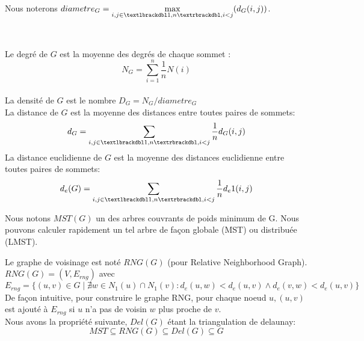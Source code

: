 \begin{mydef}
Nous noterons $diametre_G= \max\limits_{i,j\in \textlbrackdbl 1,n \textrbrackdbl,i<j} (d_G(i,j))$.
\end{mydef}
 


\





\begin{mydef}
 
 Le degré de $G$ est la moyenne des degrés de chaque sommet : $$N_G=\sum_{i=1}^n{\frac1n N(i)}$$\\
 La densité de $G$ est le nombre $D_G=N_G/diametre_G$\\
 La distance de $G$ est la moyenne des distances entre toutes paires de sommets:$$d_G=\sum_{i,j\in \textlbrackdbl 1,n \textrbrackdbl,i<j}{\frac1n d_G(i,j)}$$
 La distance euclidienne de $G$ est la moyenne des distances euclidienne entre toutes paires de sommets:$$d_e(G)=\sum_{i,j\in \textlbrackdbl 1,n \textrbrackdbl,i<j}{\frac1n d_e1(i,j)}$$

\end{mydef}

\begin{mydef}
 Nous notons $MST(G)$ un des arbres couvrants de poids minimum de G. Nous pouvons calculer rapidement un tel arbre de façon globale (MST) ou distribuée (LMST).
\end{mydef}

\begin{mydef}
 Le graphe de voisinage est noté $RNG(G)$ (pour Relative Neighborhood Graph).\\
 $RNG(G)=(V,E_{rng})$ avec $$E_{rng}=\{ (u,v)\in G \mid \nexists w\in N_1(u)\cap N_1(v): d_e(u,w)<d_e(u,v) \wedge d_e(v,w)<d_e(u,v)  \}$$
 De façon intuitive, pour construire le graphe RNG, pour chaque noeud $u,(u,v)$ est ajouté à $E_{rng}$ si $u$ n'a pas de voisin $w$ plus proche de $v$.\\
 Nous avons la propriété suivante, $Del(G)$ étant la triangulation de delaunay: $$  MST\subseteq RNG(G)\subseteq Del(G) \subseteq G$$

\end{mydef}




